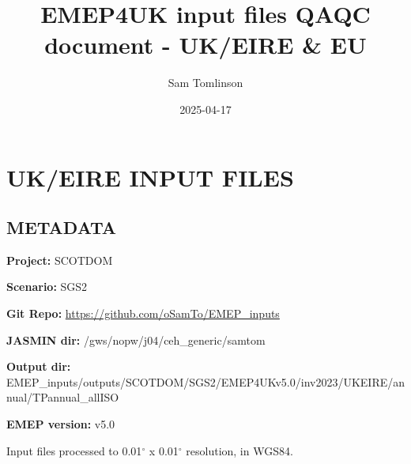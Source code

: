 \documentclass[
]{article}
\title{EMEP4UK input files QAQC document - UK/EIRE \& EU}
\author{Sam Tomlinson}
\date{2025-04-17}
\begin{document}
\maketitle

\section{UK/EIRE INPUT FILES}\label{ukeire-input-files}

\subsection{METADATA}\label{metadata}

\textbf{Project:} SCOTDOM

\textbf{Scenario:} SGS2

\textbf{Git Repo:} \url{https://github.com/oSamTo/EMEP_inputs}

\textbf{JASMIN dir:} /gws/nopw/j04/ceh\_generic/samtom

\textbf{Output dir:}
EMEP\_inputs/outputs/SCOTDOM/SGS2/EMEP4UKv5.0/inv2023/UKEIRE/annual/TPannual\_allISO

\textbf{EMEP version:} v5.0

\vspace{\baselineskip}

Input files processed to 0.01\(^\circ\) x 0.01\(^\circ\) resolution, in
WGS84.

\vspace{\baselineskip}
\end{document}
